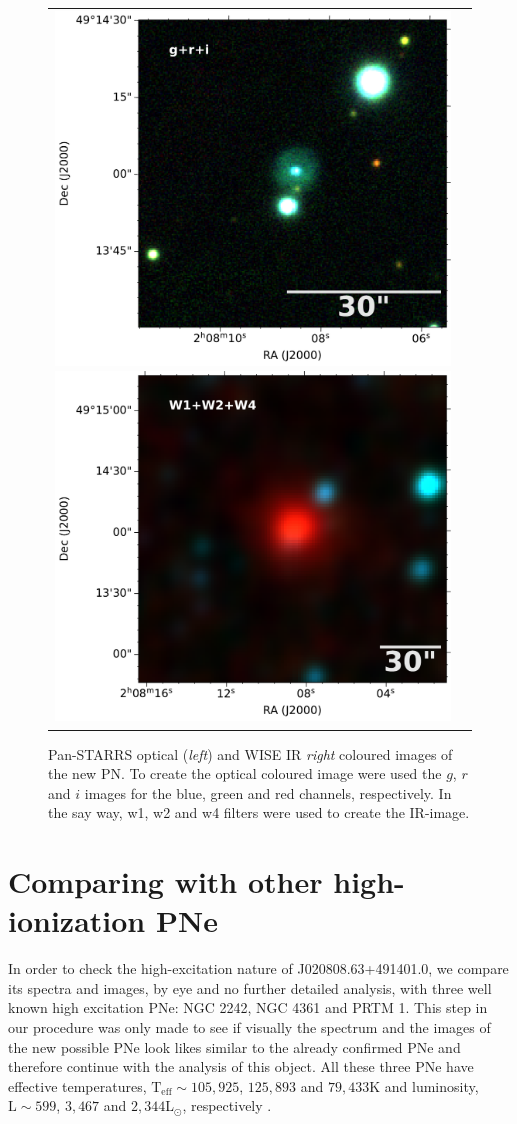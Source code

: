 \documentclass[fleqn,usenatbib]{mnras}
\begin{document}
\begin{figure}
  \centering
  \begin{tabular}{l l}
\includegraphics[width=0.5\linewidth]{Figs/cutout_rings_v3_skycell_2294_031_stk_i_unconv-irg-RGB.pdf}
\includegraphics[width=0.5\linewidth]{Figs/w4_ra32_035994_dec49_233615-421-RGB.pdf}
\end{tabular}  
  \caption{Pan-STARRS optical (\textit{left}) and WISE IR \textit{right} coloured
    images of the new PN. To create the optical coloured image were used the $g$, $r$ and $i$
    images for the blue, green and red channels, respectively. In the say way, w1, w2 and w4
    filters were used to create the IR-image.} 
  \label{fig:image}
\end{figure}


\section{Comparing with other high-ionization PNe}
\label{sec:comp}

In order to check the high-excitation nature of J020808.63+491401.0,
we compare its spectra and images, by eye and no further
detailed analysis, with three well known high excitation PNe: NGC 2242,
NGC 4361 and PRTM 1. This step in our procedure was only made
to see if visually the spectrum and the images of the new possible PNe
look likes similar to the already confirmed PNe and therefore continue with
the analysis of this object. All these three PNe have effective temperatures,
$\mathrm{T_{eff} \sim 105,925}$, $125,893$ and $79,433$K
and luminosity, $\mathrm{L \sim 599}$, $3,467$ and $2,344$L$_{\odot}$,
respectively \citep{Weidmann:2020}.
\end{document}
